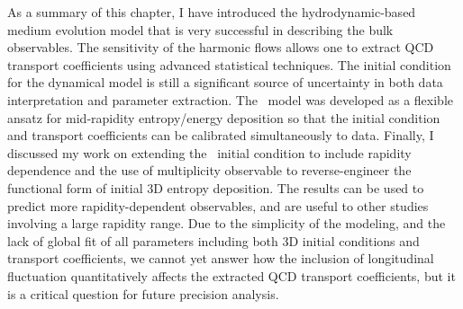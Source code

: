 As a summary of this chapter, I have introduced the hydrodynamic-based medium evolution model that is very successful in describing the bulk observables.
The sensitivity of the harmonic flows allows one to extract QCD transport coefficients using advanced statistical techniques.
The initial condition for the dynamical model is still a significant source of uncertainty in both data interpretation and parameter extraction.
The \trento\ model was developed as a flexible ansatz for mid-rapidity entropy/energy deposition so that the initial condition and transport coefficients can be calibrated simultaneously to data.
Finally, I discussed my work on extending the \trento\ initial condition to include rapidity dependence and the use of multiplicity observable to reverse-engineer the functional form of initial 3D entropy deposition.
The results can be used to predict more rapidity-dependent observables, and are useful to other studies involving a large rapidity range.
Due to the simplicity of the modeling, and the lack of global fit of all parameters including both 3D initial conditions and transport coefficients, we cannot yet answer how the inclusion of longitudinal fluctuation quantitatively affects the extracted QCD transport coefficients, but it is a critical question for future precision analysis.
